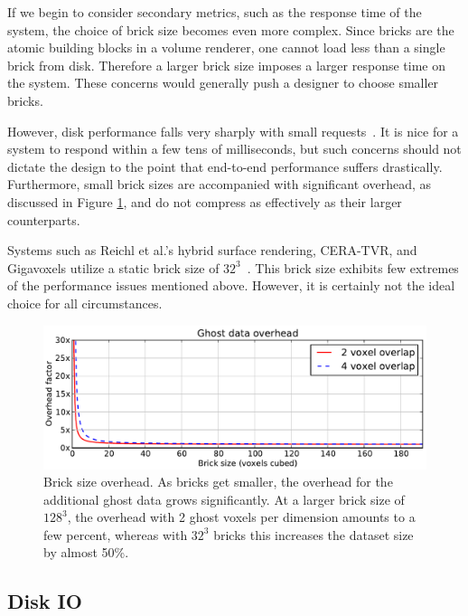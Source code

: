 If we begin to consider secondary metrics, such as the response time of
the system, the choice of brick size becomes even more complex.  Since
bricks are the atomic building blocks in a volume renderer, one cannot
load less than a single brick from disk. Therefore a larger brick size
imposes a larger response time on the system.  These concerns would
generally push a designer to choose smaller bricks.

However, disk performance falls very sharply with small
requests~\cite{Fogal:2011:PracticalIO}.  It is nice for a system to
respond within a few tens of milliseconds, but such concerns should not
dictate the design to the point that end-to-end performance suffers
drastically.  Furthermore, small brick sizes are accompanied with
significant
overhead, as discussed in Figure \ref{figrg:brick-size}, and do not
compress as effectively as their larger counterparts.

Systems such as Reichl et al.'s hybrid surface rendering, CERA-TVR, and
Gigavoxels utilize a static brick size of
$32^3$~\cite{Reichl:2012:HybridSurface, Engel:2012:CERA,
Crassin:2009:Gigavoxels}.  This brick size exhibits few extremes of the
performance issues mentioned above. However, it is certainly not the
ideal choice for all circumstances.

\begin{figure}
  \centering
  \includegraphics[width=0.99\linewidth]{images/rg/BS-overhead.pdf}
  \caption{Brick size overhead.  As bricks get smaller, the overhead
  for the additional ghost data grows significantly.  At a larger brick
  size of $128^3$, the overhead with 2 ghost voxels per dimension
  amounts to a few percent, whereas with $32^3$ bricks this increases
  the dataset size by almost 50\%.}
  \label{figrg:brick-size}
\end{figure}

\subsection{Disk IO}

